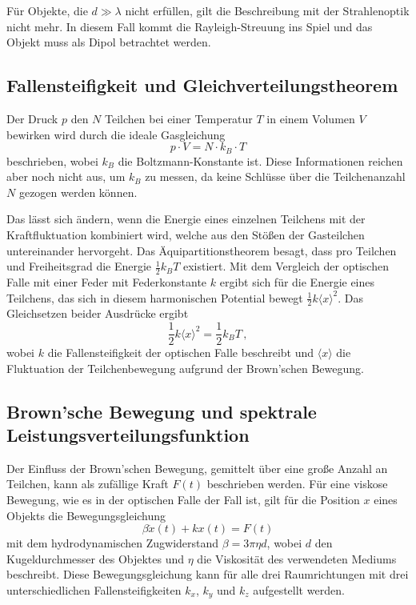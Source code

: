     Für Objekte, die $d\gg\lambda$ nicht erfüllen, gilt die Beschreibung mit der Strahlenoptik nicht mehr. In diesem Fall kommt die Rayleigh-Streuung ins Spiel und das Objekt muss als Dipol betrachtet werden. \cite{neumann}
  \subsection{Fallensteifigkeit und Gleichverteilungstheorem}
    Der Druck $p$ den $N$ Teilchen bei einer Temperatur $T$ in einem Volumen $V$ bewirken wird durch die ideale Gasgleichung
    \begin{equation}
      p\cdot V = N\cdot k_B\cdot T
    \end{equation}
    beschrieben, wobei $k_B$ die Boltzmann-Konstante ist. Diese Informationen reichen aber noch nicht aus, um $k_B$ zu messen, da keine Schlüsse über die Teilchenanzahl $N$ gezogen werden können.

    Das lässt sich ändern, wenn die Energie eines einzelnen Teilchens mit der Kraftfluktuation kombiniert wird, welche aus den Stößen der Gasteilchen untereinander hervorgeht. Das Äquipartitionstheorem besagt, dass pro Teilchen und Freiheitsgrad die Energie $\frac{1}{2}k_BT$ existiert. Mit dem Vergleich der optischen Falle mit einer Feder mit Federkonstante $k$ ergibt sich für die Energie eines Teilchens, das sich in diesem harmonischen Potential bewegt $\frac{1}{2}k\langle x\rangle^2$. Das Gleichsetzen beider Ausdrücke ergibt
    \begin{equation}
      \frac{1}{2}k\langle x\rangle^2 = \frac{1}{2}k_BT \, ,
    \end{equation}
    wobei $k$ die Fallensteifigkeit der optischen Falle beschreibt und $\langle x\rangle$  die Fluktuation der Teilchenbewegung aufgrund der Brown'schen Bewegung.
  \subsection{Brown'sche Bewegung und spektrale Leistungsverteilungsfunktion}
    Der Einfluss der Brown'schen Bewegung, gemittelt über eine große Anzahl an Teilchen, kann als zufällige Kraft $F(t)$ beschrieben werden. Für eine viskose Bewegung, wie es in der optischen Falle der Fall ist, gilt für die Position $x$ eines Objekts die Bewegungsgleichung
    \begin{equation}
      \beta \dot{x}(t) + kx(t) = F(t)
    \end{equation}
    mit dem hydrodynamischen Zugwiderstand $\beta = 3\pi\eta d$, wobei $d$ den Kugeldurchmesser des Objektes und $\eta$ die Viskosität des verwendeten Mediums beschreibt. Diese Bewegungsgleichung kann für alle drei Raumrichtungen mit drei unterschiedlichen Fallensteifigkeiten $k_x$, $k_y$ und $k_z$ aufgestellt werden.

